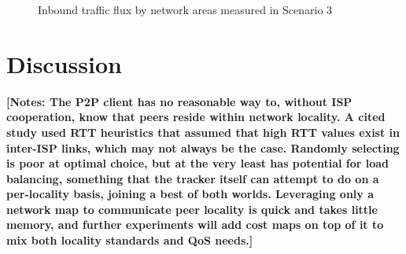 \begin{figure}[H]
\caption{Inbound traffic flux by network areas measured in Scenario 3}
\label{fig:graph-traffic-scenario3}
\end{figure}

\section{Discussion}
    \textbf{[Notes: The P2P client has no reasonable way to, without ISP cooperation, know that peers reside within network locality. A cited study used RTT heuristics that assumed that high RTT values exist in inter-ISP links, which may not always be the case. Randomly selecting is poor at optimal choice, but at the very least has potential for load balancing, something that the tracker itself can attempt to do on a per-locality basis, joining a best of both worlds. Leveraging only a network map to communicate peer locality is quick and takes little memory, and further experiments will add cost maps on top of it to mix both locality standards and QoS needs.]}


